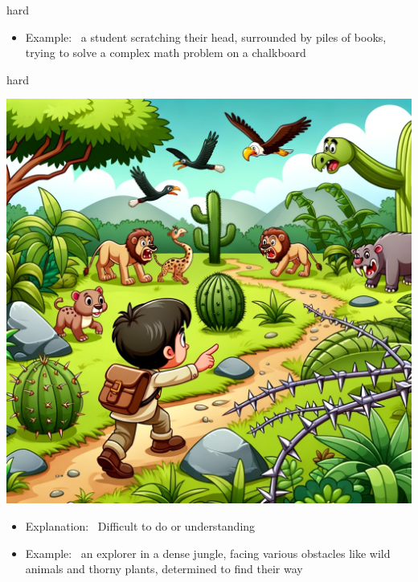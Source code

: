 \documentclass[avery5371, grid,frame]{flashcards}
\begin{document}
\begin{flashcard}{hard}
\begin{center}
\begin{minipage}[c]{.45\textwidth}
\begin{itemize}
            \item Example: \ a student scratching their head, surrounded by piles of books, trying to solve a complex math problem on a chalkboard
            \end{itemize}
        \end{minipage}
    \end{center}
    \vspace*{\fill}
\end{flashcard}\begin{flashcard}{hard}
    \vspace*{\fill}
    \begin{center}
        \begin{minipage}[c]{.45\textwidth}
            \includegraphics[width=\textwidth]{cards/h/hard/hard - an explorer in a dense jungle, facing various obstacles like wild animals and thorny plants, determined to find their way.png}
        \end{minipage}
        \begin{minipage}[c]{.45\textwidth}
            \begin{itemize}\setlength\itemsep{12pt}
            \item Explanation: \ Difficult to do or understanding

            \item Example: \ an explorer in a dense jungle, facing various obstacles like wild animals and thorny plants, determined to find their way
            \end{itemize}
        \end{minipage}
    \end{center}
    \vspace*{\fill}
\end{flashcard}
\end{document}
